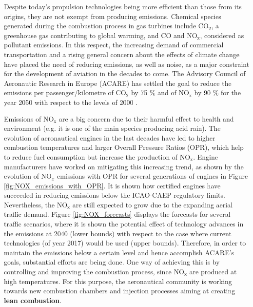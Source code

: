 
Despite today's propulsion technologies being more efficient than those from its origins, they are not exempt from producing emissions. Chemical species generated during the combustion process in gas turbines include CO$_2$, a greenhouse gas contributing to global warming, and CO and NO$_\mathrm{x}$, considered as pollutant emissions. In this respect, the increasing demand of commercial transportation and a rising general concern about the effects of climate change have placed the need of reducing emissions, as well as noise, as a major constraint for the development of aviation in the decades to come. The Advisory Council of Aeronautic Research in Europe (ACARE) has settled the goal to reduce the emissions per passenger/kilometre of CO$_2$ by 75 $\%$ and of NO$_\mathrm{x}$ by 90 $\%$ for the year 2050 with respect to the levels of 2000 .

Emissions of NO$_\mathrm{x}$ are a big concern due to their harmful effect to health and environment (e.g. it is one of the main species producing acid rain). The evolution of aeronautical engines in the last decades have led to higher combustion temperatures and larger Overall Pressure Ratios (OPR), which help to reduce fuel consumption but increase the production of NO$_\mathrm{x}$. Engine manufacturers have worked on mitigating this increasing trend, as shown by the evolution of NO$_x$ emissions with OPR for several generations of engines in Figure \ref{fig:NOX_emissions_with_OPR}. It is shown how certified engines have succeeded in reducing emissions below the ICAO-CAEP regulatory limits. Nevertheless, the NO$_\mathrm{x}$ are still expected to grow due to the expanding aerial traffic demand. Figure \ref{fig:NOX_forecasts} displays the forecasts for several traffic scenarios, where it is shown the potential effect of technology advances in the emissions at 2040 (lower bounds) with respect to the case where current technologies (of year 2017) would be used (upper bounds). Therefore, in order to maintain the emissions below a certain level and hence accomplish ACARE's goals, substantial efforts are being done. One way of achieving this is by controlling and improving the combustion process, since NO$_\mathrm{x}$ are produced at high temperatures. For this purpose, the aeronautical community is working towards new combustion chambers and injection processes aiming at creating \textbf{lean combustion}.

